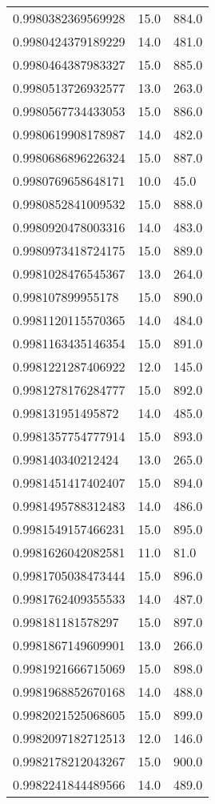 \begin{center}
\begin{supertabular}[H]{p{0.30\textwidth}p{0.05\textwidth}p{0.05\textwidth}}
0.9980382369569928 & 15.0 & 884.0 \\ 
0.9980424379189229 & 14.0 & 481.0 \\ 
0.9980464387983327 & 15.0 & 885.0 \\ 
0.9980513726932577 & 13.0 & 263.0 \\ 
0.9980567734433053 & 15.0 & 886.0 \\ 
0.9980619908178987 & 14.0 & 482.0 \\ 
0.9980686896226324 & 15.0 & 887.0 \\ 
0.9980769658648171 & 10.0 & 45.0 \\ 
0.9980852841009532 & 15.0 & 888.0 \\ 
0.9980920478003316 & 14.0 & 483.0 \\ 
0.9980973418724175 & 15.0 & 889.0 \\ 
0.9981028476545367 & 13.0 & 264.0 \\ 
0.998107899955178 & 15.0 & 890.0 \\ 
0.9981120115570365 & 14.0 & 484.0 \\ 
0.9981163435146354 & 15.0 & 891.0 \\ 
0.9981221287406922 & 12.0 & 145.0 \\ 
0.9981278176284777 & 15.0 & 892.0 \\ 
0.998131951495872 & 14.0 & 485.0 \\ 
0.9981357754777914 & 15.0 & 893.0 \\ 
0.998140340212424 & 13.0 & 265.0 \\ 
0.9981451417402407 & 15.0 & 894.0 \\ 
0.9981495788312483 & 14.0 & 486.0 \\ 
0.9981549157466231 & 15.0 & 895.0 \\ 
0.9981626042082581 & 11.0 & 81.0 \\ 
0.9981705038473444 & 15.0 & 896.0 \\ 
0.9981762409355533 & 14.0 & 487.0 \\ 
0.998181181578297 & 15.0 & 897.0 \\ 
0.9981867149609901 & 13.0 & 266.0 \\ 
0.9981921666715069 & 15.0 & 898.0 \\ 
0.9981968852670168 & 14.0 & 488.0 \\ 
0.9982021525068605 & 15.0 & 899.0 \\ 
0.9982097182712513 & 12.0 & 146.0 \\ 
0.9982178212043267 & 15.0 & 900.0 \\ 
0.9982241844489566 & 14.0 & 489.0 \\ 

\end{supertabular}
\end{center}
